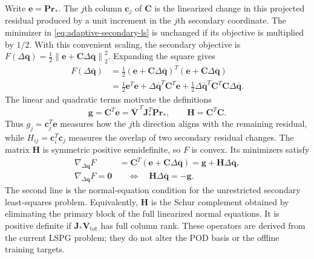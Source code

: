 \documentclass[11pt]{article}
\newcommand{\qbar}{\overline{\mathbf q}}
\newcommand{\norm}[1]{\left\lVert #1 \right\rVert}
\begin{document}
Write $\mathbf e=\mathbf P\mathbf r_*$.  The $j$th column
$\mathbf c_j$ of $\mathbf C$ is the linearized change in this projected
residual produced by a unit increment in the $j$th secondary coordinate.
The minimizer in \eqref{eq:adaptive-secondary-ls} is unchanged if its
objective is multiplied by $1/2$.  With this convenient scaling, the
secondary objective is
$F(\Delta\qbar)=\tfrac12\norm{\mathbf e+\mathbf C\Delta\qbar}_2^2$.
Expanding the square gives
\begin{equation}
\begin{aligned}
F(\Delta\qbar)
&=\tfrac12(\mathbf e+\mathbf C\Delta\qbar)^T
  (\mathbf e+\mathbf C\Delta\qbar)\\
&=\tfrac12\mathbf e^T\mathbf e
  +\Delta\qbar^T\mathbf C^T\mathbf e
  +\tfrac12\Delta\qbar^T\mathbf C^T\mathbf C\Delta\qbar.
\end{aligned}
\label{eq:adaptive-secondary-expansion}
\end{equation}
The linear and quadratic terms motivate the definitions
\begin{equation}
\mathbf g=\mathbf C^T\mathbf e
=\overline{\mathbf V}^{\,T}\mathbf J_*^T\mathbf P\mathbf r_*,
\qquad
\mathbf H=\mathbf C^T\mathbf C.
\label{eq:adaptive-schur}
\end{equation}
Thus $g_j=\mathbf c_j^T\mathbf e$ measures how the $j$th direction
aligns with the remaining residual, while
$H_{ij}=\mathbf c_i^T\mathbf c_j$ measures the overlap of two
secondary residual changes.  The matrix $\mathbf H$ is symmetric
positive semidefinite, so $F$ is convex.  Its minimizers satisfy
\begin{equation}
\begin{aligned}
\nabla_{\Delta\qbar}F
&=\mathbf C^T(\mathbf e+\mathbf C\Delta\qbar)
=\mathbf g+\mathbf H\Delta\qbar,\\
\nabla_{\Delta\qbar}F=\mathbf0
&\quad\Longleftrightarrow\quad
\mathbf H\Delta\qbar=-\mathbf g.
\end{aligned}
\label{eq:adaptive-secondary-normal-equations}
\end{equation}
The second line is the normal-equation condition for the unrestricted
secondary least-squares problem.  Equivalently, $\mathbf H$ is the
Schur complement obtained by eliminating the primary block of the full
linearized normal equations.  It is positive definite if
$\mathbf J_*\mathbf V_{\mathrm{tot}}$ has full column rank.  These
operators are derived from the current LSPG problem; they do not
alter the POD basis or the offline training targets.
\end{document}

